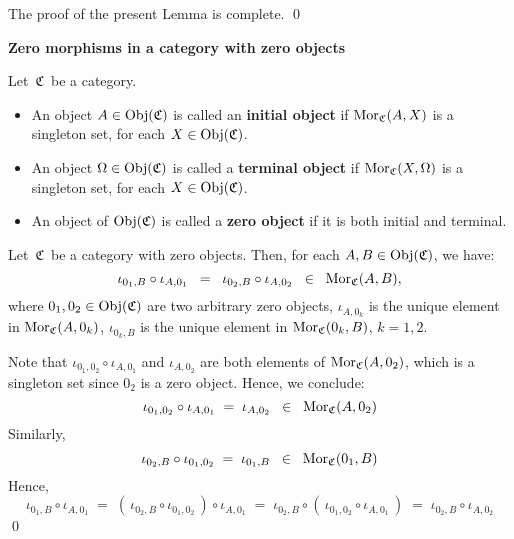 \vskip 0.3cm
\noindent
The proof of the present Lemma is complete.
\qed


\vskip 1.0cm
\noindent
\textbf{\large Zero morphisms in a category with zero objects}


\vskip 0.5cm
\begin{definition}
\mbox{}
\vskip 0.15cm
\noindent
Let \,$\mathfrak{C}$\, be a category.
\begin{itemize}
\item
	An object $A \in \textnormal{Obj}(\mathfrak{C})$ is called an \textbf{initial object} if $\textnormal{Mor}_{\mathfrak{C}}(A,X)$ is a singleton set,
	for each $X \in \textnormal{Obj}(\mathfrak{C})$.
\item
	An object $\Omega \in \textnormal{Obj}(\mathfrak{C})$ is called a \textbf{terminal object} if $\textnormal{Mor}_{\mathfrak{C}}(X,\Omega)$ is a singleton set,
	for each $X \in \textnormal{Obj}(\mathfrak{C})$.
\item
	An object of $\textnormal{Obj}(\mathfrak{C})$ is called a \textbf{zero object} if it is both initial and terminal.
\end{itemize}
\end{definition}


\vskip 0.5cm
\begin{lemma}\label{ZeroMorphisms}
\mbox{}
\vskip 0.15cm
\noindent
Let \,$\mathfrak{C}$\, be a category with zero objects.
Then, for each $A, B \in \textnormal{Obj}(\mathfrak{C})$, we have:
\begin{equation*}
\iota_{0_{1},B}\circ\iota_{A,0_{1}}
\;\; = \;\;
	\iota_{0_{2},B}\circ\iota_{A,0_{2}}
\;\; \in \;\;
	\textnormal{Mor}_{\mathfrak{C}}(A,B),
\end{equation*}
where
$0_{1}, 0_{2} \in \textnormal{Obj}(\mathfrak{C})$ are two arbitrary zero objects,
$\iota_{A,0_{k}}$ is the unique element in $\textnormal{Mor}_{\mathfrak{C}}(A,0_{k})$,
$\iota_{0_{k},B}$ is the unique element in $\textnormal{Mor}_{\mathfrak{C}}(0_{k},B)$,
$k = 1,2$.
\end{lemma}
\proof
Note that $\iota_{0_{1},0_{2}}\circ\iota_{A,0_{1}}$ and $\iota_{A,0_{2}}$ are both elements of $\textnormal{Mor}_{\mathfrak{C}}(A,0_{2})$,
which is a singleton set since $0_{2}$ is a zero object. Hence, we conclude:
\begin{equation*}
\iota_{0_{1},0_{2}}\circ\iota_{A,0_{1}} \; = \; \iota_{A,0_{2}} \;\; \in \;\; \textnormal{Mor}_{\mathfrak{C}}(A,0_{2})
\end{equation*}
Similarly,
\begin{equation*}
\iota_{0_{2},B}\circ\iota_{0_{1},0_{2}} \; = \; \iota_{0_{1},B} \;\; \in \;\; \textnormal{Mor}_{\mathfrak{C}}(0_{1},B)
\end{equation*}
Hence,
\begin{equation*}
\iota_{0_{1},B} \circ \iota_{A,0_{1}}
\; = \;
	(\,\iota_{0_{2},B}\circ\iota_{0_{1},0_{2}}\,) \circ \iota_{A,0_{1}}
\; = \;
	\iota_{0_{2},B} \circ (\,\iota_{0_{1},0_{2}} \circ \iota_{A,0_{1}}\,)
\; = \;
	\iota_{0_{2},B} \circ \iota_{A,0_{2}}
\end{equation*}
\qed

